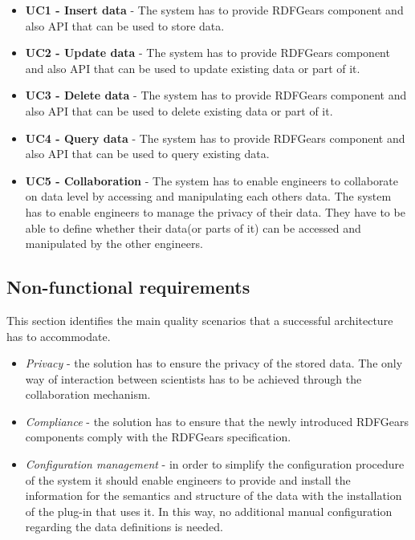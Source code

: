 \documentclass[a4paper, notitlepage]{article}
\begin{document}
\begin{itemize}

	\item \textbf{UC1 - Insert data} - The system has to provide RDFGears component and also API that can be used to store data.

	\item \textbf{UC2 - Update data } - The system has to provide RDFGears component and also API that can be used to update existing data or part of it.
	
	\item \textbf{UC3 - Delete data} - The system has to provide RDFGears component and also API that can be used to delete existing data or part of it.
	
	\item \textbf{UC4 - Query data} - The system has to provide RDFGears component and also API that can be used to query existing data.
	
	\item \textbf{UC5 - Collaboration} - The system has to enable engineers to collaborate on data level by accessing and manipulating each others data. The system has to enable engineers to manage the privacy of their data. They have to be able to define whether their data(or parts of it) can be accessed and manipulated by the other engineers.

\end{itemize}

\subsection{Non-functional requirements}
This section identifies the main quality scenarios that a successful architecture has to accommodate.

\begin{itemize}
	\item \textit{Privacy} - the solution has to ensure the privacy of the stored data. The only way of interaction between scientists has to be achieved through the collaboration mechanism.
	
	\item \textit{Compliance} - the solution has to ensure that the newly introduced RDFGears components comply with the RDFGears specification. 
	
	\item \textit{Configuration management} - in order to simplify the configuration procedure of the system it should enable engineers to provide and install the information for the semantics and structure of the data with the installation of the plug-in that uses it. In this way, no additional manual configuration regarding the data definitions is needed.
	
\end{itemize}
\end{document}
